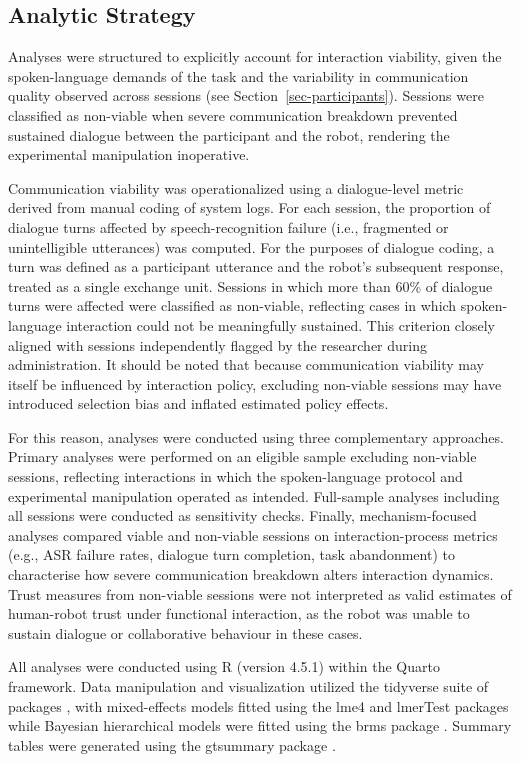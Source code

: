 \documentclass[
  authoryear,
  doubleblind,
  3p]{elsarticle}
\begin{document}
\subsection{Analytic Strategy}\label{analytic-strategy}

Analyses were structured to explicitly account for interaction
viability, given the spoken-language demands of the task and the
variability in communication quality observed across sessions (see
Section~\ref{sec-participants}). Sessions were classified as non-viable
when severe communication breakdown prevented sustained dialogue between
the participant and the robot, rendering the experimental manipulation
inoperative.

Communication viability was operationalized using a dialogue-level
metric derived from manual coding of system logs. For each session, the
proportion of dialogue turns affected by speech-recognition failure
(i.e., fragmented or unintelligible utterances) was computed. For the
purposes of dialogue coding, a turn was defined as a participant
utterance and the robot's subsequent response, treated as a single
exchange unit. Sessions in which more than 60\% of dialogue turns were
affected were classified as non-viable, reflecting cases in which
spoken-language interaction could not be meaningfully sustained. This
criterion closely aligned with sessions independently flagged by the
researcher during administration. It should be noted that because
communication viability may itself be influenced by interaction policy,
excluding non-viable sessions may have introduced selection bias and
inflated estimated policy effects.

For this reason, analyses were conducted using three complementary
approaches. Primary analyses were performed on an eligible sample
excluding non-viable sessions, reflecting interactions in which the
spoken-language protocol and experimental manipulation operated as
intended. Full-sample analyses including all sessions were conducted as
sensitivity checks. Finally, mechanism-focused analyses compared viable
and non-viable sessions on interaction-process metrics (e.g., ASR
failure rates, dialogue turn completion, task abandonment) to
characterise how severe communication breakdown alters interaction
dynamics. Trust measures from non-viable sessions were not interpreted
as valid estimates of human-robot trust under functional interaction, as
the robot was unable to sustain dialogue or collaborative behaviour in
these cases.

All analyses were conducted using R (version 4.5.1) within the Quarto
framework. Data manipulation and visualization utilized the tidyverse
suite of packages \citep{wickham2019}, with mixed-effects models fitted
using the lme4 and lmerTest packages \citep{bates2015, kuznetsova2017}
while Bayesian hierarchical models were fitted using the brms package
\citep{burkner2018}. Summary tables were generated using the gtsummary
package \citep{sjoberg2021}.
\end{document}
